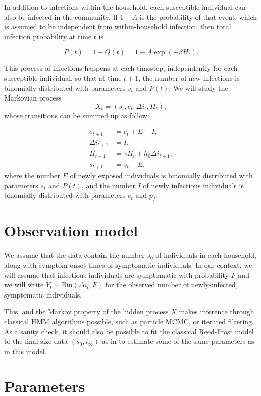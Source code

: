 \documentclass[a4paper]{article}
\begin{document}
In addition to infections within the household, each susceptible individual can
also be infected in the community. If \(1-A\) is the probability of that event,
which is assumed to be independent from within-household infection, then total
infection probability at time \(t\) is 

\[
	P(t)=1-Q(t) = 1-A\exp(-\beta H_t).
\]

This process of infections happens at each timestep, independently for each
susceptible individual, so that at time \(t+1\), the number of new infections is
binomially distributed with parameters \(s_t\) and \(P(t)\). We will study the
Markovian process
\begin{equation}
	X_t=(s_t,e_t,\Delta i_t,H_t),
\end{equation}
whose transitions can be summed up as follow:

\begin{align}
	e_{t+1} & = e_t + E - I, \\
	\Delta i_{t+1} & = I, \\
	H_{t+1} & = \gamma H_t + h_0 \Delta i_{t+1}, \\
	s_{t+1} & = s_t - E,
\end{align}
where the number \(E\) of newly exposed individuals is binomially distributed
with parameters \(s_t\) and \(P(t)\), and the number \(I\) of newly infectious
individuals is binomially distributed with parameters \(e_t\) and \(p_I\).

\section*{Observation model}

We assume that the data contain the number \(s_0\) of individuals in each
household, along with symptom onset times of symptomatic individuals. In our
context, we will assume that infectious individuals are symptomatic with
probability \(F\) and we will write \(Y_t \sim \text{Bin}(\Delta i_t,F)\) for 
the observed number of newly-infected, symptomatic individuals. 

This, and the Markov property of the hidden process \(X\) makes inference 
through classical HMM algorithms possible, such as particle MCMC, or iterated
filtering. As a sanity check, it should also be possible to fit the classical
Reed-Frost model to the final size data \((s_0,i_\infty)\) as in 
\cite{Cauchemez2014} to
estimate some of the same parameters as in this model.

\section*{Parameters}
\end{document}
